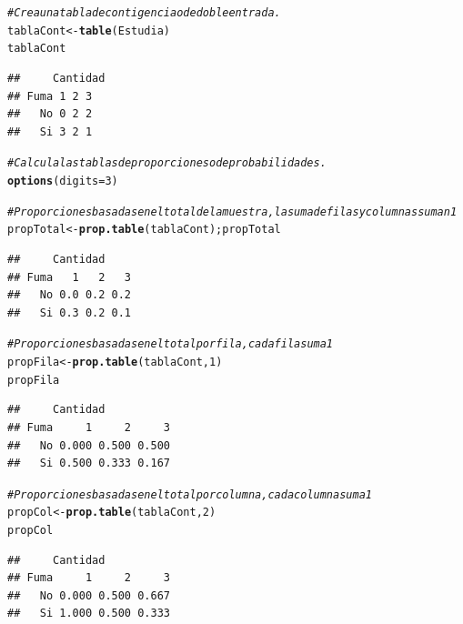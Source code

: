 \documentclass[10pt,a4paper]{article}\usepackage[]{graphicx}\usepackage[]{color}
\makeatletter
\newcommand{\hlnum}[1]{\textcolor[rgb]{0.686,0.059,0.569}{#1}}%
\newcommand{\hlcom}[1]{\textcolor[rgb]{0.678,0.584,0.686}{\textit{#1}}}%
\newcommand{\hlstd}[1]{\textcolor[rgb]{0.345,0.345,0.345}{#1}}%
\newcommand{\hlkwb}[1]{\textcolor[rgb]{0.69,0.353,0.396}{#1}}%
\newcommand{\hlkwc}[1]{\textcolor[rgb]{0.333,0.667,0.333}{#1}}%
\newcommand{\hlkwd}[1]{\textcolor[rgb]{0.737,0.353,0.396}{\textbf{#1}}}%
\newenvironment{kframe}{%
 \def\at@end@of@kframe{}%
 \ifinner\ifhmode%
  \def\at@end@of@kframe{\end{minipage}}%
  \begin{minipage}{\columnwidth}%
 \fi\fi%
 \def\FrameCommand##1{\hskip\@totalleftmargin \hskip-\fboxsep
 \colorbox{shadecolor}{##1}\hskip-\fboxsep
     \hskip-\linewidth \hskip-\@totalleftmargin \hskip\columnwidth}%
 \MakeFramed {\advance\hsize-\width
   \@totalleftmargin\z@ \linewidth\hsize
   \@setminipage}}%
 {\par\unskip\endMakeFramed%
 \at@end@of@kframe}
\newenvironment{knitrout}{}{} %
\makeatother
\begin{document}
\begin{knitrout}
\color{fgcolor}\begin{kframe}
\begin{alltt}
\hlcom{#Crea una tabla de contigencia o de doble entrada. }
\hlstd{tablaCont} \hlkwb{<-} \hlkwd{table}\hlstd{(Estudia)}
\hlstd{tablaCont}
\end{alltt}
\begin{verbatim}
##     Cantidad
## Fuma 1 2 3
##   No 0 2 2
##   Si 3 2 1
\end{verbatim}
\begin{alltt}
\hlcom{#Calcula las tablas de proporciones o de probabilidades. }
\hlkwd{options}\hlstd{(}\hlkwc{digits}\hlstd{=}\hlnum{3}\hlstd{)}

\hlcom{# Proporciones basadas en el total de la muestra, la suma de filas y columnas suman 1 }
\hlstd{propTotal} \hlkwb{<-} \hlkwd{prop.table}\hlstd{(tablaCont); propTotal}
\end{alltt}
\begin{verbatim}
##     Cantidad
## Fuma   1   2   3
##   No 0.0 0.2 0.2
##   Si 0.3 0.2 0.1
\end{verbatim}
\begin{alltt}
\hlcom{# Proporciones basadas en el total por fila, cada fila suma 1 }
\hlstd{propFila} \hlkwb{<-} \hlkwd{prop.table}\hlstd{(tablaCont,} \hlnum{1}\hlstd{)}
\hlstd{propFila}
\end{alltt}
\begin{verbatim}
##     Cantidad
## Fuma     1     2     3
##   No 0.000 0.500 0.500
##   Si 0.500 0.333 0.167
\end{verbatim}
\begin{alltt}
\hlcom{# Proporciones basadas en el total por columna, cada columna suma 1 }
\hlstd{propCol} \hlkwb{<-} \hlkwd{prop.table}\hlstd{(tablaCont,} \hlnum{2}\hlstd{)}
\hlstd{propCol}
\end{alltt}
\begin{verbatim}
##     Cantidad
## Fuma     1     2     3
##   No 0.000 0.500 0.667
##   Si 1.000 0.500 0.333
\end{verbatim}
\end{kframe}
\end{knitrout}
\end{document}
